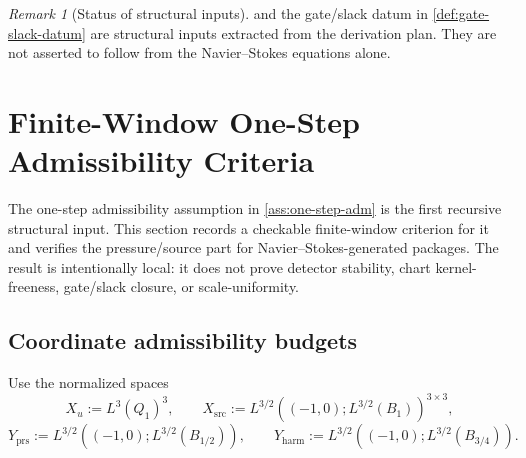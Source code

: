 \documentclass[11pt]{article}
\numberwithin{equation}{section}
\theoremstyle{plain}
\theoremstyle{definition}
\theoremstyle{remark}
\newtheorem{remark}[theorem]{Remark}
\newcommand{\prs}{\mathrm{prs}}
\newcommand{\harm}{\mathrm{harm}}
\begin{document}
\begin{remark}[Status of structural inputs]
 and the gate/slack datum
in \cref{def:gate-slack-datum} are structural inputs extracted from the
derivation plan.  They are not asserted to follow from the Navier--Stokes
equations alone.
\end{remark}


\section{Finite-Window One-Step Admissibility Criteria}

The one-step admissibility assumption in \cref{ass:one-step-adm} is the first
recursive structural input.  This section records a checkable finite-window
criterion for it and verifies the pressure/source part for
Navier--Stokes-generated packages.  The result is intentionally local: it
does not prove detector stability, chart kernel-freeness, gate/slack closure,
or scale-uniformity.

\subsection{Coordinate admissibility budgets}

Use the normalized spaces
\[
  X_u:=L^3(Q_1)^3,\qquad
  X_{\mathrm{src}}
  :=
  L^{3/2}((-1,0);L^{3/2}(B_1))^{3\times3},
\]
\[
  Y_{\prs}:=L^{3/2}((-1,0);L^{3/2}(B_{1/2})),
  \qquad
  Y_{\harm}:=L^{3/2}((-1,0);L^{3/2}(B_{3/4})).
\]
\end{document}
